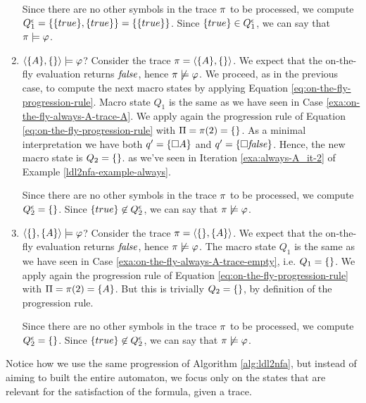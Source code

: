 \begin{example}
\begin{enumerate}
		Since there are no other symbols in the trace $\pi$ to be processed, we compute $Q_1^\epsilon = \{\{true\}, \{true\}\} = \{\{true\}\}$. Since $\{true\} \in Q_1^\epsilon$, we can say that $\pi \models \varphi$.\label{exa:on-the-fly-always-A-trace-A}
		
		\item $\langle \{A\}, \{\} \rangle \models \varphi$? Consider the trace $\pi = \langle \{A\}, \{\} \rangle$. We expect that the on-the-fly evaluation returns $\mathit{false}$, hence $\pi \not\models \varphi$. We proceed, as in the previous case, to compute the next macro states by applying Equation \ref{eq:on-the-fly-progression-rule}. Macro state $Q_1$ is the same as we have seen in Case \ref{exa:on-the-fly-always-A-trace-A}. 
		We apply again the progression rule of Equation \ref{eq:on-the-fly-progression-rule} with $\Pi = \pi(2) = \{\}$. 
		As a minimal interpretation we have both $q' = \{\Box A\}$ and $q' = \{\Box \mathit{false}\}$. Hence, the new macro state is $Q_2 = \{\}$. as we've seen in Iteration \ref{exa:always-A_it-2} of Example \ref{ldl2nfa-example-always}.
		
		Since there are no other symbols in the trace $\pi$ to be processed, we compute $Q_2^\epsilon = \{\}$. Since $\{true\} \not\in Q_2^\epsilon$, we can say that $\pi \not\models \varphi$.
		
		\item $\langle \{\}, \{A\} \rangle \models \varphi$? Consider the trace $\pi = \langle \{\}, \{A\} \rangle$. We expect that the on-the-fly evaluation returns $\mathit{false}$, hence $\pi \not\models \varphi$. The macro state $Q_1$ is the same as we have seen in Case \ref{exa:on-the-fly-always-A-trace-empty}, i.e. $Q_1 = \{\}$. 
		We apply again the progression rule of Equation \ref{eq:on-the-fly-progression-rule} with $\Pi = \pi(2) = \{A\}$. But this is trivially $Q_2 = \{\}$, by definition of the progression rule.
		
		Since there are no other symbols in the trace $\pi$ to be processed, we compute $Q_2^\epsilon = \{\}$. Since $\{true\} \not\in Q_2^\epsilon$, we can say that $\pi \not\models \varphi$.
		
	\end{enumerate}	
	Notice how we use the same progression  of Algorithm \ref{alg:ldl2nfa}, but instead of aiming to built the entire automaton, we focus only on the states that are relevant for the satisfaction of the formula, given a trace.
	
\end{example}

